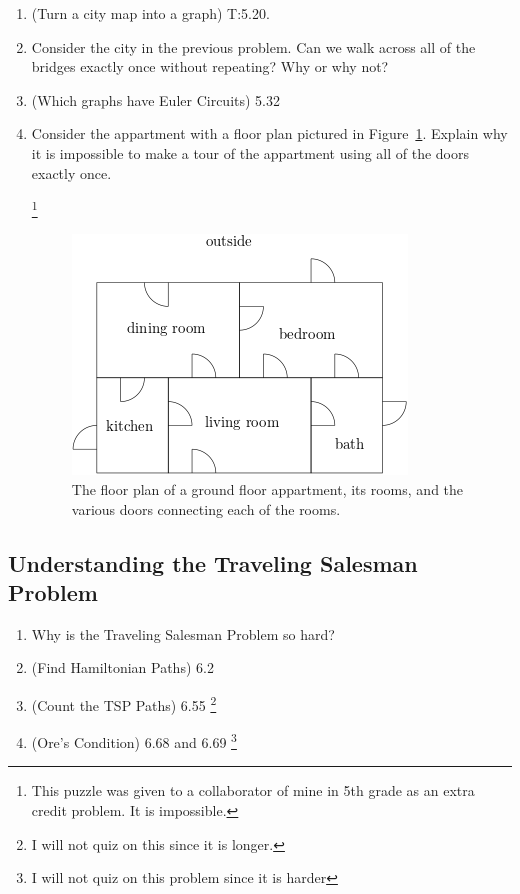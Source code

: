 \documentclass[11pt, letterpaper]{article}
\begin{document}
\begin{enumerate}
	\item (Turn a city map into a graph) T:5.20.
	\item Consider the city in the previous problem. Can we walk across all of the bridges exactly once without repeating? Why or why not?
	\item (Which graphs have Euler Circuits) 5.32
	\item Consider the appartment with a floor plan pictured in Figure~\ref{F:floor-plan}.
	Explain why it is impossible to make a tour of the appartment using all of the doors exactly once. 
	
	\footnote{This puzzle was given to a collaborator of mine in 5th grade as an extra credit problem. 
	It is impossible. 
	}
	
	\begin{figure}[h]
		\begin{center}
			\includegraphics[scale=0.5]{floor-plan}
		\end{center}
		\caption{The floor plan of a ground floor appartment, its rooms, and the various doors connecting each of the rooms.  }\label{F:floor-plan}
	\end{figure}
	
	
	
	
\end{enumerate}

\subsection{Understanding the Traveling Salesman Problem}

\begin{enumerate}
	\item Why is the Traveling Salesman Problem so hard?
	\item (Find Hamiltonian Paths) 6.2
	\item (Count the TSP Paths) 6.55 \footnote{I will not quiz on this since it is longer.}
	\item (Ore's Condition) 6.68 and 6.69 \footnote{I will not quiz on this problem since it is harder}
\end{enumerate}
\end{document}
